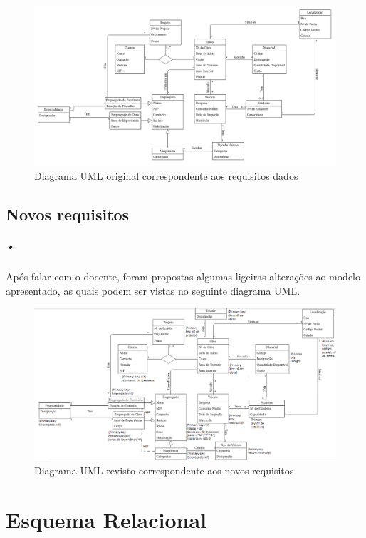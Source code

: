 \documentclass{report}
\begin{document}
			\begin{figure}[hb!]
				\centering
				\includegraphics[scale=0.45, angle=-90]{UML-Original.png}
				\caption{Diagrama UML original correspondente aos requisitos dados}
			\end{figure}
		
		\section{Novos requisitos}
			
			\paragraph{•}Após falar com o docente, foram propostas algumas ligeiras
			alterações ao modelo apresentado, as quais podem ser vistas no seguinte diagrama
			UML.
			
			\begin{figure}[hb!]
				\centering
				\includegraphics[scale=0.65, angle=-90]{UML-Revisto.png}
				\caption{Diagrama UML revisto correspondente aos novos requisitos}
			\end{figure}
	\chapter{Esquema Relacional}
	
\end{document}

